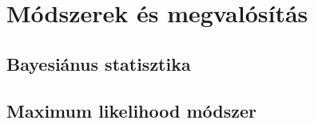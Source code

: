 \section{Módszerek és megvalósítás}

\subsection{Bayesiánus statisztika}

\subsection{Maximum likelihood módszer}

 